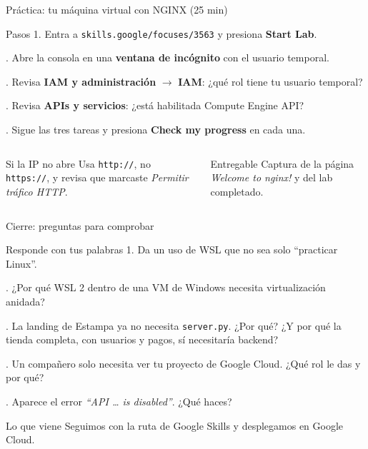 \documentclass[aspectratio=169,10pt,c]{beamer}
\begin{document}
\begin{frame}{Práctica: tu máquina virtual con NGINX \textnormal{\small(25 min)}}
\begin{block}{Pasos}
\small
1. Entra a \texttt{skills.google/focuses/3563} y presiona \textbf{Start Lab}.\par{}. Abre la consola en una \textbf{ventana de incógnito} con el usuario temporal.\par{}. Revisa \textbf{IAM y administración} $\rightarrow$ \textbf{IAM}: ¿qué rol tiene tu usuario temporal?\par{}. Revisa \textbf{APIs y servicios}: ¿está habilitada Compute Engine API?\par{}. Sigue las tres tareas y presiona \textbf{Check my progress} en cada una.
\end{block}
\begin{columns}[T,onlytextwidth]
\begin{exampleblock}{Si la IP no abre}
\small Usa \texttt{http://}, no \texttt{https://}, y revisa que marcaste \emph{Permitir tráfico HTTP}.
\end{exampleblock}
\begin{alertblock}{Entregable}
\small Captura de la página \emph{Welcome to nginx!} y del lab completado.
\end{alertblock}
\end{columns}
\end{frame}

\begin{frame}{Cierre: preguntas para comprobar}
\begin{block}{Responde con tus palabras}
\small
1. Da un uso de WSL que no sea solo ``practicar Linux''.\par{}. ¿Por qué WSL 2 dentro de una VM de Windows necesita virtualización anidada?\par{}. La landing de Estampa ya no necesita \texttt{server.py}. ¿Por qué? ¿Y por qué la tienda completa, con usuarios y pagos, sí necesitaría backend?\par{}. Un compañero solo necesita ver tu proyecto de Google Cloud. ¿Qué rol le das y por qué?\par{}. Aparece el error \emph{``API \ldots{} is disabled''}. ¿Qué haces?
\end{block}
\begin{alertblock}{Lo que viene}
\small Seguimos con la ruta de Google Skills y desplegamos en Google Cloud.
\end{alertblock}
\end{frame}
\end{document}
